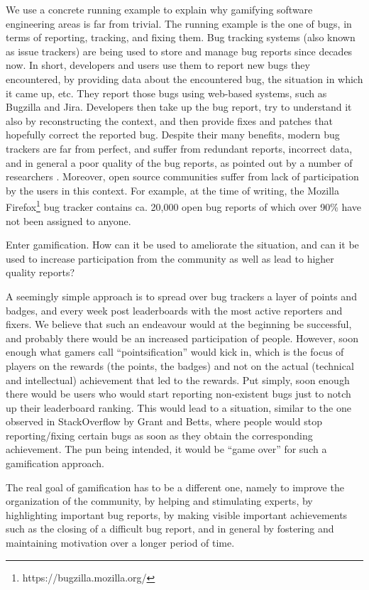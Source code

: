 We use a concrete running example to explain why gamifying software engineering areas is far from trivial.
The running example is the one of bugs, in terms of reporting, tracking, and fixing them.
Bug tracking systems (also known as issue trackers) are being used to store and manage bug reports since decades now.
In short, developers and users use them to report new bugs they encountered, by providing data about the encountered bug, the situation in which it came up, etc.
They report those bugs using web-based systems, such as Bugzilla and Jira.
Developers then take up the bug report, try to understand it also by reconstructing the context, and then provide fixes and patches that hopefully correct the reported bug.
Despite their many benefits, modern bug trackers are far from perfect, and suffer from redundant reports, incorrect data, and in general a poor quality of the bug reports, as pointed out by a number of researchers \cite{Bird2009a} \cite{Zimm2010a}.
Moreover, open source communities suffer from lack of participation by the users in this context.
For example, at the time of writing, the Mozilla Firefox\footnote{https://bugzilla.mozilla.org/} bug tracker contains ca.
20,000 open bug reports of which over 90\% have not been assigned to anyone.

Enter gamification.
How can it be used to ameliorate the situation, and can it be used to increase participation from the community as well as lead to higher quality reports?

A seemingly simple approach is to spread over bug trackers a layer of points and badges, and every week post leaderboards with the most active reporters and fixers.
We believe that such an endeavour would at the beginning be successful, and probably there would be an increased participation of people.
However, soon enough what gamers call ``pointsification'' would kick in, which is the focus of players on the rewards (the points, the badges) and not on the actual (technical and intellectual) achievement that led to the rewards.
Put simply, soon enough there would be users who would start reporting non-existent bugs just to notch up their leaderboard ranking.
This would lead to a situation, similar to the one observed in StackOverflow by Grant and Betts, where people would stop reporting/fixing certain bugs as soon as they obtain the corresponding achievement.
The pun being intended, it would be ``game over'' for such a gamification approach.

The real goal of gamification has to be a different one, namely to improve the organization of the community, by helping and stimulating experts, by highlighting important bug reports, by making visible important achievements such as the closing of a difficult bug report, and in general by fostering and maintaining motivation over a longer period of time.

